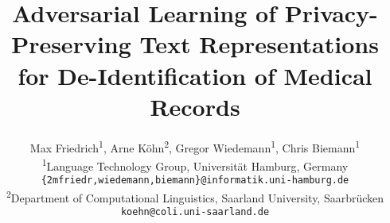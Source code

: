 \documentclass[11pt,a4paper]{article}
\title{Adversarial Learning of Privacy-Preserving Text Representations for De-Identification of Medical Records}
\author{Max Friedrich\textsuperscript{1}, Arne Köhn\textsuperscript{2}, Gregor Wiedemann\textsuperscript{1}, Chris Biemann\textsuperscript{1}\\[3mm] 
\textsuperscript{1}Language Technology Group, Universität Hamburg, Germany\\
\texttt{\{2mfriedr,wiedemann,biemann\}@informatik.uni-hamburg.de}\\[3mm]
\textsuperscript{2}Department of Computational Linguistics, Saarland University, Saarbrücken\\
\texttt{koehn@coli.uni-saarland.de}}
\begin{document}
\maketitle


\acresetall




\end{document}
